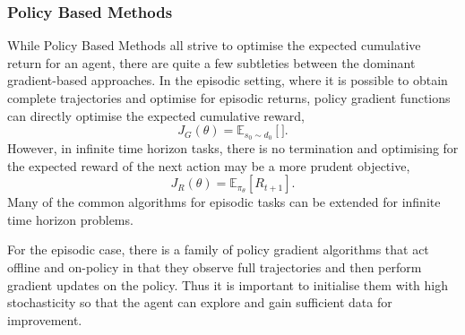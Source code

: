 \subsubsection{Policy Based Methods}
While Policy Based Methods all strive to optimise the expected cumulative return for an agent, there are quite a few subtleties between the dominant gradient-based approaches. In the episodic setting, where it is possible to obtain complete trajectories and optimise for episodic returns, policy gradient functions can directly optimise the expected cumulative reward,
\begin{equation}
	J_G(\theta) = \mathbb{E}_{s_0 \sim d_0}\left[].
\end{equation}
However, in infinite time horizon tasks, there is no termination and optimising for the expected reward of the next action may be a more prudent objective,
\begin{equation}
	J_R(\theta)
	= \mathbb{E}_{\pi_{\theta}}\left[R_{t+1}\right].
\end{equation}
Many of the common algorithms for episodic tasks can be extended for infinite time horizon problems.

For the episodic case, there is a family of policy gradient algorithms that act offline and on-policy in that they observe full trajectories and then perform gradient updates on the policy. Thus it is important to initialise them with high stochasticity so that the agent can explore and gain sufficient data for improvement.

